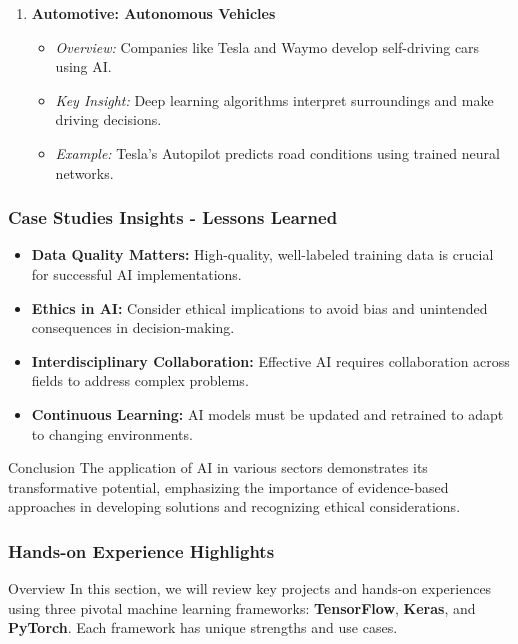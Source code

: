 \documentclass{beamer}
\begin{document}
\begin{frame}[fragile]
\begin{enumerate}
        \item \textbf{Automotive: Autonomous Vehicles}
            \begin{itemize}
                \item \textit{Overview:} Companies like Tesla and Waymo develop self-driving cars using AI.
                \item \textit{Key Insight:} Deep learning algorithms interpret surroundings and make driving decisions.
                \item \textit{Example:} Tesla’s Autopilot predicts road conditions using trained neural networks.
            \end{itemize}
    \end{enumerate}
\end{frame}

\begin{frame}[fragile]
    \frametitle{Case Studies Insights - Lessons Learned}
    \begin{itemize}
        \item \textbf{Data Quality Matters:} High-quality, well-labeled training data is crucial for successful AI implementations.
        \item \textbf{Ethics in AI:} Consider ethical implications to avoid bias and unintended consequences in decision-making.
        \item \textbf{Interdisciplinary Collaboration:} Effective AI requires collaboration across fields to address complex problems.
        \item \textbf{Continuous Learning:} AI models must be updated and retrained to adapt to changing environments.
    \end{itemize}

    \begin{block}{Conclusion}
        The application of AI in various sectors demonstrates its transformative potential, emphasizing the importance of evidence-based approaches in developing solutions and recognizing ethical considerations.
    \end{block}
\end{frame}

\begin{frame}
    \frametitle{Hands-on Experience Highlights}
    \begin{block}{Overview}
        In this section, we will review key projects and hands-on experiences using three pivotal machine learning frameworks: \textbf{TensorFlow}, \textbf{Keras}, and \textbf{PyTorch}. Each framework has unique strengths and use cases.
    \end{block}
\end{frame}
\end{document}
